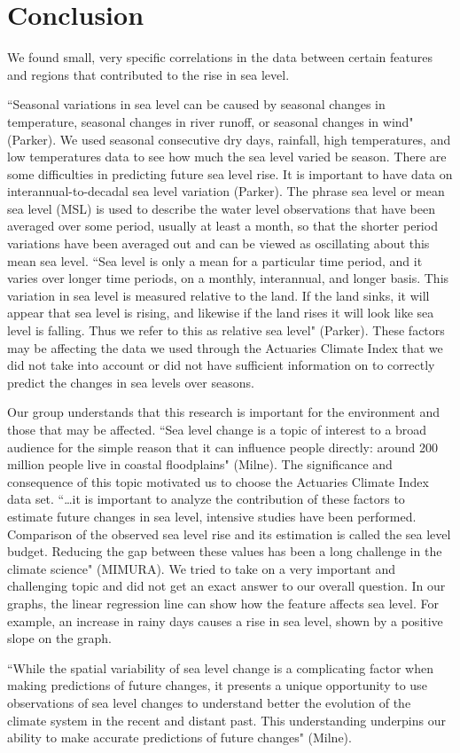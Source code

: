 \documentclass[12pt]{report}
\begin{document}
\section* {Conclusion}
\indent \par We found small, very specific correlations in the data between certain features and regions that contributed to the rise in sea level. 
\par \textquotedblleft Seasonal variations in sea level can be caused by seasonal changes in temperature, seasonal changes in river runoff, or seasonal changes in wind" (Parker). We used seasonal consecutive dry days, rainfall, high temperatures, and low temperatures data to see how much the sea level varied be season. There are some difficulties in predicting future sea level rise. It is important to have data on interannual-to-decadal sea level variation (Parker). The phrase sea level or mean sea level (MSL) is used to describe the water level observations that have been averaged over some period, usually at least a month, so that the shorter period variations have been averaged out and can be viewed as oscillating about this mean sea level. \textquotedblleft Sea level is only a mean for a particular time period, and it varies over longer time periods, on a monthly, interannual, and longer basis. This variation in sea level is measured relative to the land. If the land sinks, it will appear that sea level is rising, and likewise if the land rises it will look like sea level is falling. Thus we refer to this as relative sea level" (Parker). These factors may be affecting the data we used through the Actuaries Climate Index that we did not take into account or did not have sufficient information on to correctly predict the changes in sea levels over seasons. 
\par Our group understands that this research is important for the environment and those that may be affected. \textquotedblleft Sea level change is a topic of interest to a broad audience for the simple reason that it can influence people directly: around 200 million people live in coastal floodplains" (Milne). The significance and consequence of this topic motivated us to choose the Actuaries Climate Index data set. \textquotedblleft…it is important to analyze the contribution of these factors to estimate future changes in sea level, intensive studies have been performed. Comparison of the observed sea level rise and its estimation is called the sea level budget. Reducing the gap between these values has been a long challenge in the climate science" (MIMURA). We tried to take on a very important and challenging topic and did not get an exact answer to our overall question. In our graphs, the linear regression line can show how the feature affects sea level. For example, an increase in rainy days causes a rise in sea level, shown by a positive slope on the graph.
\par \textquotedblleft While the spatial variability of sea level change is a complicating factor when making predictions of future changes, it presents a unique opportunity to use observations of sea level changes to understand better the evolution of the climate system in the recent and distant past. This understanding underpins our ability to make accurate predictions of future changes" (Milne).
\end{document}
